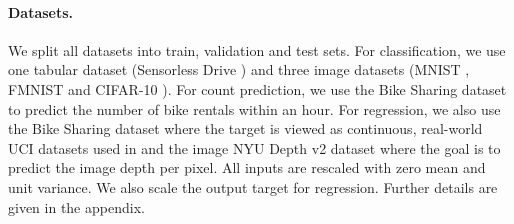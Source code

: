 
\paragraph{Datasets.} We split all datasets into train, validation and test sets. For classification, we use one tabular dataset (Sensorless Drive \citep{uci_datasets}) and three image datasets (MNIST \citep{mnist}, FMNIST \citep{fashionmnist} and CIFAR-10 \citep{cifar10}). For count prediction, we use the Bike Sharing dataset \citep{bike-sharing} to predict the number of bike rentals within an hour. For regression, we also use the Bike Sharing dataset where the target is viewed as continuous, real-world UCI datasets used in \citep{evidential-regression, probabilistic-backprop-scalable-bnn} and the image NYU Depth v2 dataset \citep{nyu-depth} where the goal is to predict the image depth per pixel. All inputs are rescaled with zero mean and unit variance. We also scale the output target for regression. Further details are given in the appendix.

